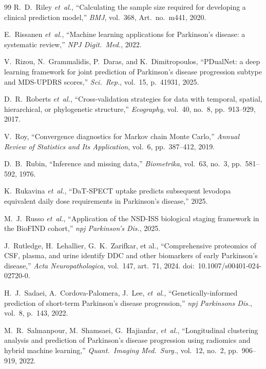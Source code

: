 \begin{thebibliography}{99}
R.~D.~Riley \textit{et~al.}, ``Calculating the sample size required for developing a clinical prediction model,'' \textit{BMJ}, vol.~368, Art.\ no.~m441, 2020.

E.~Rissanen \textit{et~al.}, ``Machine learning applications for Parkinson's disease: a systematic review,'' \textit{NPJ Digit.\ Med.}, 2022.

V.~Rizou, N.~Grammalidis, P.~Daras, and K.~Dimitropoulos, ``PDualNet: a deep learning framework for joint prediction of Parkinson's disease progression subtype and MDS-UPDRS scores,'' \textit{Sci.\ Rep.}, vol.~15, p.~41931, 2025.

D.~R.~Roberts \textit{et~al.}, ``Cross-validation strategies for data with temporal, spatial, hierarchical, or phylogenetic structure,'' \textit{Ecography}, vol.~40, no.~8, pp.~913--929, 2017.

V.~Roy, ``Convergence diagnostics for Markov chain Monte Carlo,'' \textit{Annual Review of Statistics and Its Application}, vol.~6, pp.~387--412, 2019.

D.~B.~Rubin, ``Inference and missing data,'' \textit{Biometrika}, vol.~63, no.~3, pp.~581--592, 1976.

K.~Rukavina \textit{et~al.}, ``DaT-SPECT uptake predicts subsequent
levodopa equivalent daily dose requirements in Parkinson's disease,''
2025.

M.~J.~Russo \textit{et~al.}, ``Application of the NSD-ISS biological staging framework in the BioFIND cohort,'' \textit{npj Parkinson's Dis.}, 2025.


J.~Rutledge, H.~Lehallier, G.~K.~Zarifkar, et al., ``Comprehensive proteomics of CSF, plasma, and urine identify DDC and other biomarkers of early Parkinson's disease,'' \textit{Acta Neuropathologica}, vol.~147, art.~71, 2024. doi:~10.1007/s00401-024-02720-0.

H.~J.~Sadaei, A.~Cordova-Palomera, J.~Lee, \textit{et~al.}, ``Genetically-informed prediction of short-term Parkinson's disease progression,'' \textit{npj Parkinsons Dis.}, vol.~8, p.~143, 2022.

M.~R.~Salmanpour, M.~Shamsaei, G.~Hajianfar, \textit{et~al.}, ``Longitudinal clustering analysis and prediction of Parkinson's disease progression using radiomics and hybrid machine learning,'' \textit{Quant.\ Imaging Med.\ Surg.}, vol.~12, no.~2, pp.~906--919, 2022.


\end{thebibliography}
